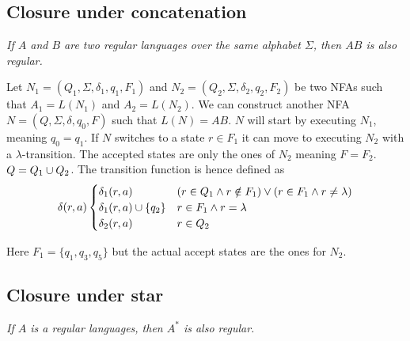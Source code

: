 \documentclass{article}
\newcommand{\emptyString}{\lambda}
\begin{document}
\subsection{Closure under concatenation}

\textit{If \(A\) and \(B\) are two regular languages over the same alphabet
\(\Sigma\), then \(AB\) is also regular.}

Let \(N_1 = (Q_1, \Sigma, \delta_1, q_1, F_1)\) and
\(N_2 = (Q_2, \Sigma, \delta_2, q_2, F_2)\) be two NFAs such that
\(A_1 = L(N_1)\) and \(A_2 = L(N_2)\).
We can construct another NFA \(N=(Q, \Sigma, \delta, q_0, F)\)
such that \(L(N)=AB\).
\(N\) will start by executing \(N_1\), meaning \(q_0=q_1\). If \(N\) switches to a state
\(r\in F_1\) it can move to executing \(N_2\) with a \(\emptyString\)-transition.
The accepted states are only the ones of \(N_2\) meaning \(F=F_2\). \(Q=Q_1 \cup Q_2\).
The transition function is hence defined as
\[
    \delta(r, a)
    \begin{cases}
        \delta_1(r, a) & (r \in Q_1 \land r \notin F_1) \lor (r \in F_1 \land r \neq \emptyString) \\
        \delta_1(r, a) \union \{q_2\} & r \in F_1 \land r = \emptyString \\
        \delta_2(r, a) & r \in Q_2
    \end{cases}
\]

\begin{center}
\end{center}
Here \(F_1 = \{q_1, q_3, q_5\}\) but the actual accept states are the ones for \(N_2\).

\subsection{Closure under star}

\textit{If \(A\) is a regular languages, then \(A^*\) is also regular.}
\end{document}
